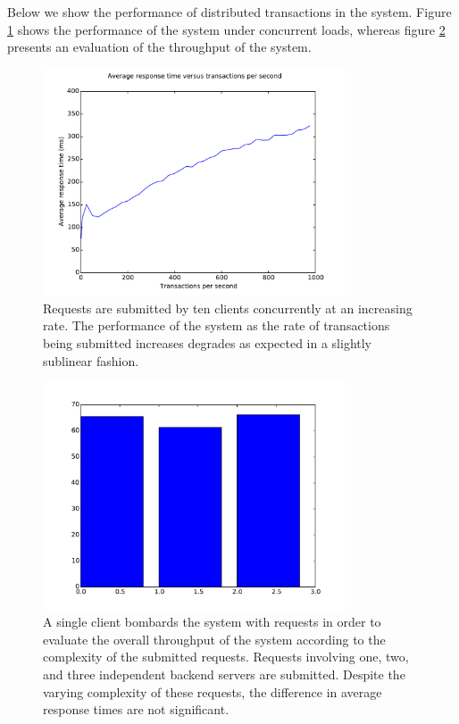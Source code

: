 \documentclass[letterpaper,11pt]{article}
\begin{document}
Below we show the performance of distributed transactions in the system.
Figure \ref{fig:performance-vs-tps} shows the performance of the system under
concurrent loads, whereas figure \ref{fig:throughput} presents an evaluation of
the throughput of the system.

\begin{figure}[ht]
    \centering
    \includegraphics[width=0.8\textwidth]{figure.pdf}
    \caption{
        Requests are submitted by ten clients concurrently at an
        increasing rate. The performance of the system as the rate of
        transactions being submitted increases degrades as expected in a
        slightly sublinear fashion.
    }
    \label{fig:performance-vs-tps}
\end{figure}

\begin{figure}[ht]
    \centering
    \includegraphics[width=0.8\textwidth]{bars.pdf}
    \caption{
        A single client bombards the system with requests in order to evaluate
        the overall throughput of the system according to the complexity of the
        submitted requests. Requests involving one, two, and three independent
        backend servers are submitted. Despite the varying complexity of these
        requests, the difference in average response times are not significant.
    }
    \label{fig:throughput}
\end{figure}
\end{document}
